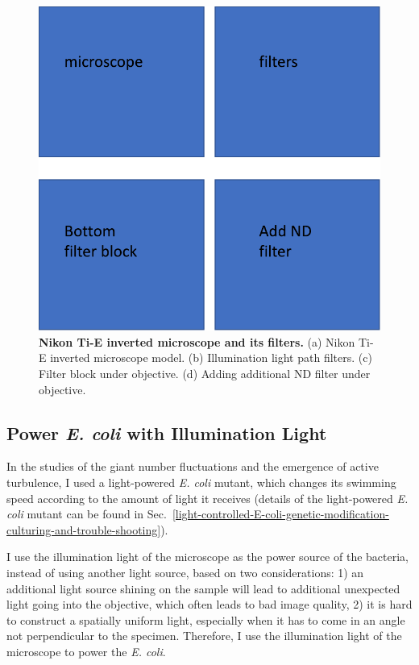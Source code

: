\begin{figure}[!htbp]
	\begin{center}
	\includegraphics[width=5.5 in]{Figs/2-Exp/3.pdf}
	\end{center}
	\caption[Nikon Ti-E inverted microscope and its filters]
	{
	\textbf{Nikon Ti-E inverted microscope and its filters.}
	(a) Nikon Ti-E inverted microscope model.
	(b) Illumination light path filters.
	(c) Filter block under objective.
	(d) Adding additional ND filter under objective.
	}
	\label{fig:2-3}
\end{figure}

\subsection{Power \textit{E. coli} with Illumination Light}
In the studies of the giant number fluctuations and the emergence of active turbulence, I used a light-powered \textit{E. coli} mutant, which changes its swimming speed according to the amount of light it receives (details of the light-powered \textit{E. coli} mutant can be found in Sec.~\ref{light-controlled-E-coli-genetic-modification-culturing-and-trouble-shooting}).

I use the illumination light of the microscope as the power source of the bacteria, instead of using another light source, based on two considerations: 1) an additional light source shining on the sample will lead to additional unexpected light going into the objective, which often leads to bad image quality, 2) it is hard to construct a spatially uniform light, especially when it has to come in an angle not perpendicular to the specimen. Therefore, I use the illumination light of the microscope to power the \textit{E. coli}.

